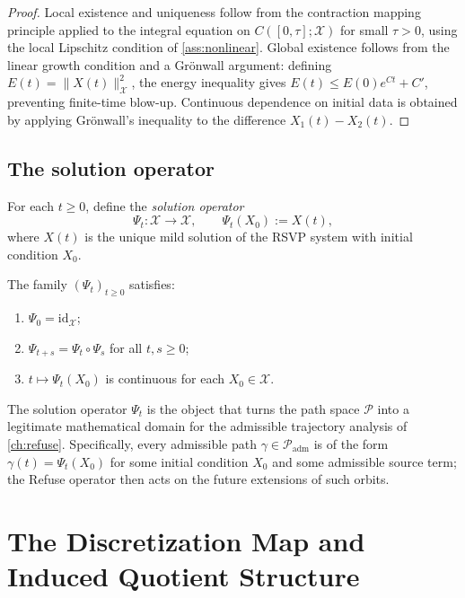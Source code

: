 \documentclass[12pt, oneside]{memoir}
\newcommand{\X}{\mathcal{X}}
\newcommand{\PP}{\mathcal{P}}
\newcommand{\Padm}{\mathcal{P}_{\mathrm{adm}}}
\newcommand{\nnorm}[1]{\lVert #1 \rVert}
\begin{document}
\begin{proof}
Local existence and uniqueness follow from the contraction mapping principle applied to
the integral equation on $C([0,\tau]; \X)$ for small $\tau > 0$, using the local Lipschitz
condition of \cref{ass:nonlinear}.  Global existence follows from the linear growth
condition and a Grönwall argument: defining $E(t) = \nnorm{X(t)}_\X^2$, the energy
inequality gives $E(t) \le E(0) e^{Ct} + C'$, preventing finite-time blow-up.
Continuous dependence on initial data is obtained by applying Grönwall's inequality
to the difference $X_1(t) - X_2(t)$.
\end{proof}

\section{The solution operator}

\begin{definition}
\label{def:Psi}
For each $t \ge 0$, define the \emph{solution operator}
\[
  \Psi_t: \X \to \X, \qquad \Psi_t(X_0) := X(t),
\]
where $X(t)$ is the unique mild solution of the RSVP system with initial condition $X_0$.
\end{definition}

\begin{proposition}
\label{prop:Psi-semigroup}
The family $(\Psi_t)_{t \ge 0}$ satisfies:
\begin{enumerate}
  \item $\Psi_0 = \mathrm{id}_\X$;
  \item $\Psi_{t+s} = \Psi_t \circ \Psi_s$ for all $t, s \ge 0$;
  \item $t \mapsto \Psi_t(X_0)$ is continuous for each $X_0 \in \X$.
\end{enumerate}
\end{proposition}

The solution operator $\Psi_t$ is the object that turns the path space $\PP$ into a
legitimate mathematical domain for the admissible trajectory analysis of \cref{ch:refuse}.
Specifically, every admissible path $\gamma \in \Padm$ is of the form $\gamma(t) =
\Psi_t(X_0)$ for some initial condition $X_0$ and some admissible source term; the
Refuse operator then acts on the future extensions of such orbits.

\chapter{The Discretization Map and Induced Quotient Structure}
\label{ch:quotient}
\end{document}
